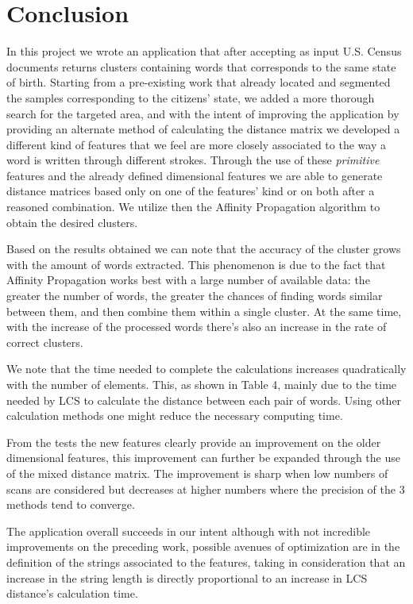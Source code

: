 \section{Conclusion}
In this project we wrote an application that after accepting as input U.S. Census documents returns clusters containing words that corresponds to the same state of birth.
Starting from a pre-existing work that already located and segmented the samples corresponding to the citizens' state, we added a more thorough search for the targeted area, and with the intent of improving the application by providing an alternate method of calculating the distance matrix we developed a different kind of features that we feel are more closely associated to the way a word is written through different strokes.
Through the use of these \textit{primitive} features and the already defined dimensional features we are able to generate distance matrices based only on one of the features' kind or on both after a reasoned combination.
We utilize then the Affinity Propagation algorithm to obtain the desired clusters.

Based on the results obtained we can note that the accuracy of the cluster grows with the amount of words extracted. This phenomenon is due to the fact that Affinity Propagation works best with a large number of available data: the greater the number of words, the greater the chances of finding words similar between them, and then combine them within a single cluster. At the same time, with the increase of the processed words there's also an increase in the rate of correct clusters. 

We note that the time needed to complete the calculations increases quadratically with the number of elements. This, as shown in Table 4, mainly due to the time needed by LCS to calculate the distance between each pair of words. Using other calculation methods one might reduce the necessary computing time.

From the tests the new features clearly provide an improvement on the older dimensional features, this improvement can further be expanded through the use of the mixed distance matrix. The improvement is sharp when low numbers of scans are considered but decreases at higher numbers where the precision of the 3 methods tend to converge.

The application overall succeeds in our intent although with not incredible improvements on the preceding work, possible avenues of optimization are in the definition of the strings associated to the features, taking in consideration that an increase in the string length is directly proportional to an increase in LCS distance's calculation time.

